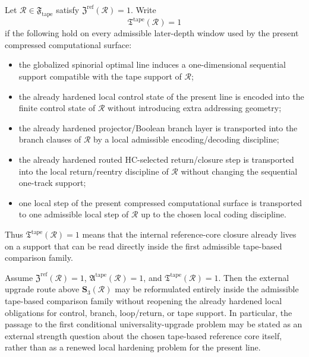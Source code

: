 \begin{definition}
Let \(\mathcal R\in\mathfrak F_{\mathrm{tape}}\) satisfy \(\mathfrak Z^{\mathrm{ref}}(\mathcal R)=1\). Write
\[
\mathfrak T^{\mathrm{tape}}(\mathcal R)=1
\]
if the following hold on every admissible later-depth window used by the present compressed computational surface:
\begin{itemize}[leftmargin=2em]
 \item the globalized spinorial optimal line induces a one-dimensional sequential support compatible with the tape support of \(\mathcal R\);
 \item the already hardened local control state of the present line is encoded into the finite control state of \(\mathcal R\) without introducing extra addressing geometry;
 \item the already hardened projector/Boolean branch layer is transported into the branch clauses of \(\mathcal R\) by a local admissible encoding/decoding discipline;
 \item the already hardened routed HC-selected return/closure step is transported into the local return/reentry discipline of \(\mathcal R\) without changing the sequential one-track support;
 \item one local step of the present compressed computational surface is transported to one admissible local step of \(\mathcal R\) up to the chosen local coding discipline.
\end{itemize}
Thus \(\mathfrak T^{\mathrm{tape}}(\mathcal R)=1\) means that the internal reference-core closure already lives on a support that can be read directly inside the first admissible tape-based comparison family.
\end{definition}

\begin{proposition}
Assume \(\mathfrak Z^{\mathrm{ref}}(\mathcal R)=1\), \(\mathfrak A^{\mathrm{tape}}(\mathcal R)=1\), and \(\mathfrak T^{\mathrm{tape}}(\mathcal R)=1\). Then the external upgrade route above \(\mathbf S_3(\mathcal R)\) may be reformulated entirely inside the admissible tape-based comparison family without reopening the already hardened local obligations for control, branch, loop/return, or tape support. In particular, the passage to the first conditional universality-upgrade problem may be stated as an external strength question about the chosen tape-based reference core itself, rather than as a renewed local hardening problem for the present line.
\end{proposition}


